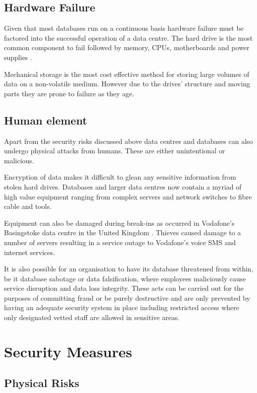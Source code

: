 \documentclass[11pt, twocolumn]{article}
\begin{document}
\subsection{Hardware Failure}
Given that most databases run on a continuous basis hardware failure must be factored into the successful operation of a data centre.  The hard drive is the most common component to fail followed by memory, CPUs, motherboards and power supplies \cite{sean9}.

Mechanical storage is the most cost effective method for storing large volumes of data on a non-volatile medium\cite{sean2}.  However due to the drives’ structure and moving parts they are prone to failure as they age.

\subsection{Human element}
Apart from the security risks discussed above data centres and databases can also undergo physical attacks from humans.  These are either unintentional or malicious.

Encryption of data makes it difficult to glean any sensitive information from stolen hard drives.  Databases and larger data centres now contain a myriad of high value equipment ranging from complex servers and network switches to fibre cable and tools.

Equipment can also be damaged during break-ins as occurred in Vodafone’s Basingstoke data centre in the United Kingdom \cite{sean8}.  Thieves caused damage to a number of servers resulting in a service outage to Vodafone's voice SMS and internet services.

It is also possible for an organisation to have its database threatened from within, be it database sabotage or data falsification, where employees maliciously cause service disruption and data loss integrity.  These acts can be carried out for the purposes of committing fraud or be purely destructive and are only prevented by having an adequate security system in place including restricted access where only designated vetted staff are allowed in sensitive areas.


\section{Security Measures}

\subsection{Physical Risks}
\end{document}
